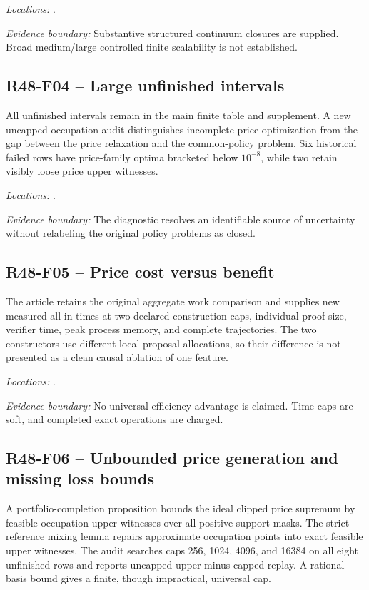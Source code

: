 \noindent\emph{Locations:} .

\noindent\emph{Evidence boundary:} Substantive structured continuum closures are supplied. Broad medium/large controlled finite scalability is not established.

\subsection{R48-F04 -- Large unfinished intervals}
All unfinished intervals remain in the main finite table and supplement. A new uncapped occupation audit distinguishes incomplete price optimization from the gap between the price relaxation and the common-policy problem. Six historical failed rows have price-family optima bracketed below $10^{-8}$, while two retain visibly loose price upper witnesses.

\noindent\emph{Locations:} .

\noindent\emph{Evidence boundary:} The diagnostic resolves an identifiable source of uncertainty without relabeling the original policy problems as closed.

\subsection{R48-F05 -- Price cost versus benefit}
The article retains the original aggregate work comparison and supplies new measured all-in times at two declared construction caps, individual proof size, verifier time, peak process memory, and complete trajectories. The two constructors use different local-proposal allocations, so their difference is not presented as a clean causal ablation of one feature.

\noindent\emph{Locations:} .

\noindent\emph{Evidence boundary:} No universal efficiency advantage is claimed. Time caps are soft, and completed exact operations are charged.

\subsection{R48-F06 -- Unbounded price generation and missing loss bounds}
A portfolio-completion proposition bounds the ideal clipped price supremum by feasible occupation upper witnesses over all positive-support masks. The strict-reference mixing lemma repairs approximate occupation points into exact feasible upper witnesses. The audit searches caps 256, 1024, 4096, and 16384 on all eight unfinished rows and reports uncapped-upper minus capped replay. A rational-basis bound gives a finite, though impractical, universal cap.

